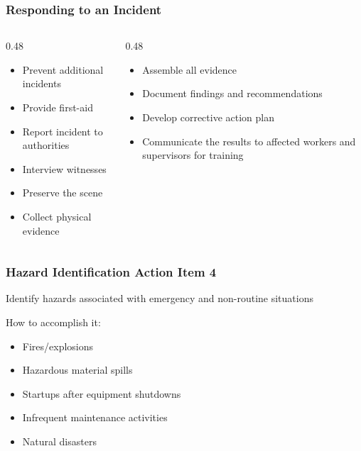 \begin{frame}
	\frametitle{Responding to an Incident}

        \begin{columns}[t]
            \begin{column}{0.48\linewidth}
                \begin{itemize}
                    \item Prevent additional incidents
                    \item Provide first-aid
                    \item Report incident to authorities
                    \item Interview witnesses
                    \item Preserve the scene
                    \item Collect physical evidence
                \end{itemize}
            \end{column}
            \begin{column}{0.48\linewidth}
                \begin{itemize}
                    \item Assemble all evidence
                    \item Document findings and recommendations
                    \item Develop corrective action plan
                    \item Communicate the results to affected workers and supervisors for training
                \end{itemize}
            \end{column}
        \end{columns} 
\end{frame}

\begin{frame}
	\frametitle{Hazard Identification Action Item 4}

    Identify hazards associated with emergency and non-routine situations

    \begin{block}{How to accomplish it:}
        \begin{itemize}[<+- | alert@+>]
            \item Fires/explosions
            \item Hazardous material spills
            \item Startups after equipment shutdowns
            \item Infrequent maintenance activities
            \item Natural disasters
        \end{itemize}
    \end{block}
\end{frame}

